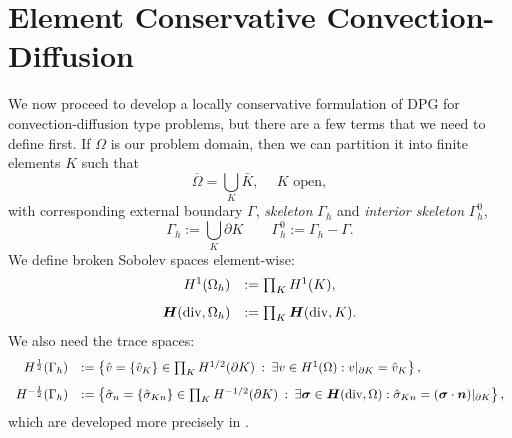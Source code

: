 \documentclass[Proposal.tex]{subfiles}
\begin{document}

\section{Element Conservative Convection-Diffusion}
We now proceed to develop a locally conservative formulation of DPG for
convection-diffusion type problems, but there are a few terms that we need to
define first. If $\Omega$ is our problem domain, then we can partition it into
finite elements $K$ such that
\[
\overline{\Omega} = \bigcup_K  \bar{K},\: \quad K \text { open},
\]
with corresponding external boundary $\Gamma$, {\em skeleton} $\Gamma_h$ and {\em interior
  skeleton} $\Gamma_h^0$,
\[
\Gamma_h := \bigcup_K \partial K\qquad \Gamma_h^0 := \Gamma_h - \Gamma.
\]
We define broken Sobolev spaces element-wise:
\[
\begin{array}{rl}
H^1(\Omega_h) & := \prod_K H^1(K), \\[8pt]
\mbox{\boldmath $H$}(\text{div},\Omega_h) & := \prod_K \mbox{\boldmath $H$}(\text{div},K).
\end{array}
\]
We also need the trace spaces:
\[
\begin{array}{rl}
H^\frac{1}{2}(\Gamma_h) & := \left\{ \hat{v} = \{\hat{v}_K \} \in \prod_K H^{1/2}(\partial K) \: :
\: \exists v \in H^1(\Omega) : v|_{\partial K} = \hat{v}_K \right\}, \\[8pt]
H^{-\frac{1}{2}}(\Gamma_h) & := \left\{ {\hat{\sigma}}_n = \{ {\hat{\sigma}}_{Kn} \}\in \prod_K H^{-1/2}(\partial K) \: : \: \exists \boldsymbol\sigma \in \mbox{\boldmath $H$}(\text{div},\Omega)
: {\hat{\sigma}}_{Kn} = (\boldsymbol\sigma \cdot \boldsymbol n)|_{\partial K} \right\},
\end{array}
\]
which are developed more precisely in \cite{DPGStokes}.
\end{document}
